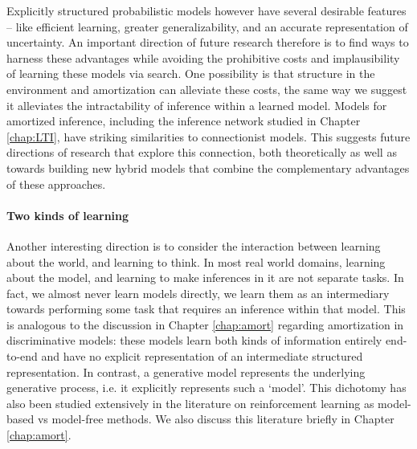 Explicitly structured probabilistic models however have several desirable features -- like efficient learning\citep{kemp2007learning}, greater generalizability\citep{lake2017building}, and an accurate representation of uncertainty\cite{hacking2006emergence}. An important direction of future research therefore is to find ways to harness these advantages while avoiding the prohibitive costs and implausibility of learning these models via search. One possibility is that structure in the environment and amortization can alleviate these costs, the same way we suggest it alleviates the intractability of inference within a learned model. Models for amortized inference, including the inference network studied in Chapter \ref{chap:LTI}, have striking similarities to connectionist models. This suggests future directions of research that explore this connection, both theoretically as well as towards building new hybrid models that combine the complementary advantages of these approaches.


\paragraph{Two kinds of learning}

Another interesting direction is to consider the interaction between learning about the world, and learning to think. In most real world domains, learning about the model, and learning to make inferences in it are not separate tasks. In fact, we almost never learn models directly, we learn them as an intermediary towards performing some task that requires an inference within that model. This is analogous to the discussion in Chapter \ref{chap:amort} regarding amortization in discriminative models: these models learn both kinds of information entirely end-to-end and have no explicit representation of an intermediate structured representation. In contrast, a generative model represents the underlying generative process, i.e. it explicitly represents such a `model'. This dichotomy has also been studied extensively in the literature on reinforcement learning as model-based vs model-free methods. We also discuss this literature briefly in Chapter \ref{chap:amort}.

